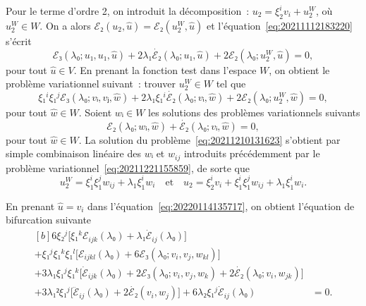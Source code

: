 \documentclass[12pt, final]{amsart}
\begin{document}
Pour le terme d'ordre 2, on introduit la décomposition~:
\(u_2=ξ_2^iv_i+u_2^W\), où \(u_2^W∈W\). On a alors
\(ℰ₂(u_2, \hat{u})=ℰ₂(u_2^W, \hat{u})\) et l'équation~\eqref{eq:20211112183220}
s'écrit
\begin{equation}
  ℰ₃(λ₀; u₁, u₁, \hat{u})+2λ₁\dot{ℰ₂}(λ₀; u₁, \hat{u})
  +2ℰ₂(λ₀; u_2^W, \hat{u})=0,
\end{equation}
pour tout \(\hat{u}∈V\). En prenant la fonction test dans l'espace \(W\), on
obtient le problème variationnel suivant~: trouver \(u_2^W∈W\) tel que
\begin{equation}
  \label{eq:20211210131623}
  ξ₁^iξ₁^jℰ₃(λ₀; vᵢ, vⱼ, \hat{w})
  +2λ₁ξ₁^i\dot{ℰ₂}(λ₀; vᵢ, \hat{w})
  +2ℰ₂(λ₀; u_2^W, \hat{w})=0,
\end{equation}
pour tout \(\hat{w}∈W\). Soient \(wᵢ∈W\) les solutions des problèmes
variationnels suivants
\begin{equation}
  \label{eq:20220208143055}
  ℰ₂(λ₀; wᵢ, \hat{w})+\dot{ℰ₂}(λ₀; vᵢ, \hat{w})=0,
\end{equation}
pour tout \(\hat{w}∈W\). La solution du problème~\eqref{eq:20211210131623}
s'obtient par simple combinaison linéaire des \(wᵢ\) et \(w_{ij}\) introduits
précédemment par le problème variationnel~\eqref{eq:20211221155859}, de sorte
que
\begin{equation}
  \label{eq:20220124135324}
  u_2^W=ξ_1^iξ_1^jw_{ij}+λ_1ξ_1^i w_i
  \quad\text{et}\quad
  u_2=ξ_2^iv_i+ξ_1^iξ_1^jw_{ij}+λ_1ξ_1^i w_i.
\end{equation}

En prenant \(\hat{u}=v_i\) dans l'équation~\eqref{eq:20220114135717}, on
obtient l'équation de bifurcation suivante
\begin{equation}
  \label{eq:20220210143805}
  \begin{aligned}[b]
    6ξ₂^j\bigl[ξ₁^kℰ_{ijk}(λ₀)+λ₁\dot{ℰ}_{ij}(λ₀)\bigr]&\\
    +ξ₁^jξ₁^kξ₁^l\bigl[ℰ_{ijkl}(λ₀)+6ℰ₃(λ₀; v_i, v_j, w_{kl})\bigr]&\\
    +3λ₁ξ₁^jξ₁^k\bigl[\dot{ℰ}_{ijk}(λ₀)+2ℰ₃(λ₀; v_i, v_j, w_k)
    +2\dot{ℰ₂}(λ₀; v_i, w_{jk})\bigr]&\\
    +3λ₁²ξ₁^j\bigl[\ddot{ℰ}_{ij}(λ₀)+2\dot{ℰ₂}(v_i, w_j)\bigr]
    +6λ₂ξ₁^j\dot{ℰ}_{ij}(λ₀)
    &=0.
  \end{aligned}
\end{equation}
\end{document}
